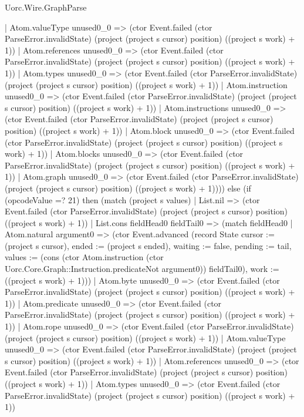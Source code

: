 \begin{lexlean}{Uorc.Wire.GraphParse}
\begin{semanticmodule}
{          | Atom.valueType unused0_0 => (ctor Event.failed (ctor ParseError.invalidState) (project (project s cursor) position) ((project s work) + 1))
          | Atom.references unused0_0 => (ctor Event.failed (ctor ParseError.invalidState) (project (project s cursor) position) ((project s work) + 1))
          | Atom.types unused0_0 => (ctor Event.failed (ctor ParseError.invalidState) (project (project s cursor) position) ((project s work) + 1))
          | Atom.instruction unused0_0 => (ctor Event.failed (ctor ParseError.invalidState) (project (project s cursor) position) ((project s work) + 1))
          | Atom.instructions unused0_0 => (ctor Event.failed (ctor ParseError.invalidState) (project (project s cursor) position) ((project s work) + 1))
          | Atom.block unused0_0 => (ctor Event.failed (ctor ParseError.invalidState) (project (project s cursor) position) ((project s work) + 1))
          | Atom.blocks unused0_0 => (ctor Event.failed (ctor ParseError.invalidState) (project (project s cursor) position) ((project s work) + 1))
          | Atom.graph unused0_0 => (ctor Event.failed (ctor ParseError.invalidState) (project (project s cursor) position) ((project s work) + 1)))) else (if (opcodeValue =? 21) then (match (project s values)
        | List.nil => (ctor Event.failed (ctor ParseError.invalidState) (project (project s cursor) position) ((project s work) + 1))
        | List.cons fieldHead0 fieldTail0 => (match fieldHead0
          | Atom.natural argument0 => (ctor Event.advanced (record State {cursor := (project s cursor), ended := (project s ended), waiting := false, pending := tail, values := (cons (ctor Atom.instruction (ctor Uorc.Core.Graph::Instruction.predicateNot argument0)) fieldTail0), work := ((project s work) + 1)}))
          | Atom.byte unused0_0 => (ctor Event.failed (ctor ParseError.invalidState) (project (project s cursor) position) ((project s work) + 1))
          | Atom.predicate unused0_0 => (ctor Event.failed (ctor ParseError.invalidState) (project (project s cursor) position) ((project s work) + 1))
          | Atom.rope unused0_0 => (ctor Event.failed (ctor ParseError.invalidState) (project (project s cursor) position) ((project s work) + 1))
          | Atom.valueType unused0_0 => (ctor Event.failed (ctor ParseError.invalidState) (project (project s cursor) position) ((project s work) + 1))
          | Atom.references unused0_0 => (ctor Event.failed (ctor ParseError.invalidState) (project (project s cursor) position) ((project s work) + 1))
          | Atom.types unused0_0 => (ctor Event.failed (ctor ParseError.invalidState) (project (project s cursor) position) ((project s work) + 1))
}
\end{semanticmodule}
\end{lexlean}
